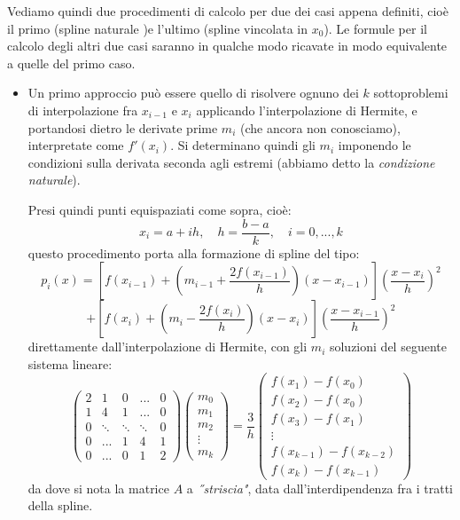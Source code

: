 \documentclass[a4paper,11pt]{article}
\begin{document}
Vediamo quindi due procedimenti di calcolo per due dei casi appena definiti, cioè il primo (spline naturale )e l'ultimo (spline vincolata in $x_0$).
Le formule per il calcolo degli altri due casi saranno in qualche modo ricavate in modo equivalente a quelle del primo caso.
\begin{itemize}
	\item Un primo approccio può essere quello di risolvere ognuno dei $k$ sottoproblemi di interpolazione fra $x_{i - 1}$ e $x_i$ applicando l'interpolazione di Hermite, e portandosi dietro le derivate prime $m_i$ (che ancora non conosciamo), interpretate come $f'(x_i)$.
		Si determinano quindi gli $m_i$ imponendo le condizioni sulla derivata seconda agli estremi (abbiamo detto la \textit{condizione naturale}).
	
		Presi quindi punti equispaziati come sopra, cioè:
		$$
		x_i = a + ih, \quad h = \frac{b - a}{k}, \quad i = 0, ..., k
		$$
		questo procedimento porta alla formazione di spline del tipo:
		$$
		p_i(x) = \left[ f(x_{i - 1}) + \left( m_{i - 1} + \frac{2 f(x_{i - 1})}{h} \right) (x - x_{i - 1})  \right] \left( \frac{x - x_i}{h} \right)^2
		$$
		$$
		+ \left[ f(x_{i}) + \left( m_{i} - \frac{2 f(x_{i })}{h} \right) (x - x_{i})  \right] \left( \frac{x - x_{i - 1}}{h} \right)^2
		$$
		direttamente dall'interpolazione di Hermite, con gli $m_i$ soluzioni del seguente sistema lineare:
		$$
		\begin{pmatrix}
			2 & 1 & 0 & ... & 0 \\ 
			1 & 4 & 1 & ... & 0 \\
			0 & \ddots & \ddots & \ddots & 0 \\
			0 & ... & 1 & 4 & 1 \\
			0 & ... & 0 & 1 & 2
		\end{pmatrix}
		\begin{pmatrix}
			m_0 \\ m_1 \\ m_2 \\ \vdots \\ m_k
		\end{pmatrix}
		=
		\frac{3}{h}
		\begin{pmatrix}
			f(x_1) - f(x_0) \\
			f(x_2) - f(x_0) \\
			f(x_3) - f(x_1) \\
			\vdots \\
			f(x_{k-1}) - f(x_{k-2}) \\
			f(x_k) - f(x_{k-1})
		\end{pmatrix}
		$$
		da dove si nota la matrice $A$ a \textit{˝striscia"}, data dall'interdipendenza fra i tratti della spline.


\end{itemize}
\end{document}

